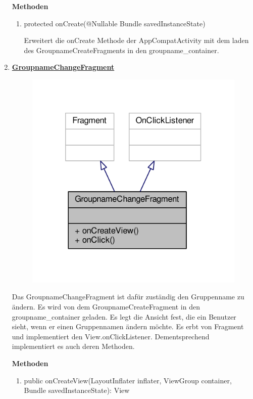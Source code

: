 \begin{enumerate}
	\textbf{Methoden}
	\begin{enumerate}
		\item protected onCreate(@Nullable Bundle savedInstanceState)
		
		Erweitert die onCreate Methode der AppCompatActivity mit dem laden des GroupnameCreateFragments in den groupname\_container.
		
	\end{enumerate}
	
	\item \textbf{\underline{GroupnameChangeFragment}}
	
	\begin{figure}[H]
		\includegraphics[scale = 1]{res/change_fragment__inherit__graph.pdf}
		\centering
	\end{figure}
	Das GroupnameChangeFragment ist dafür zuständig den Gruppenname zu ändern. Es wird von dem GroupnameCreateFragment in den groupname\_container geladen. Es legt die Ansicht fest, die ein Benutzer sieht, wenn er einen Gruppennamen ändern möchte. Es erbt von Fragment und implementiert den View.onClickListener. Dementsprechend implementiert es auch deren Methoden.
	
	\textbf{Methoden}	
	\begin{enumerate}
		\item public onCreateView(LayoutInflater inflater, ViewGroup container, Bundle savedInstanceState): View
		

\end{enumerate}
\end{enumerate}
